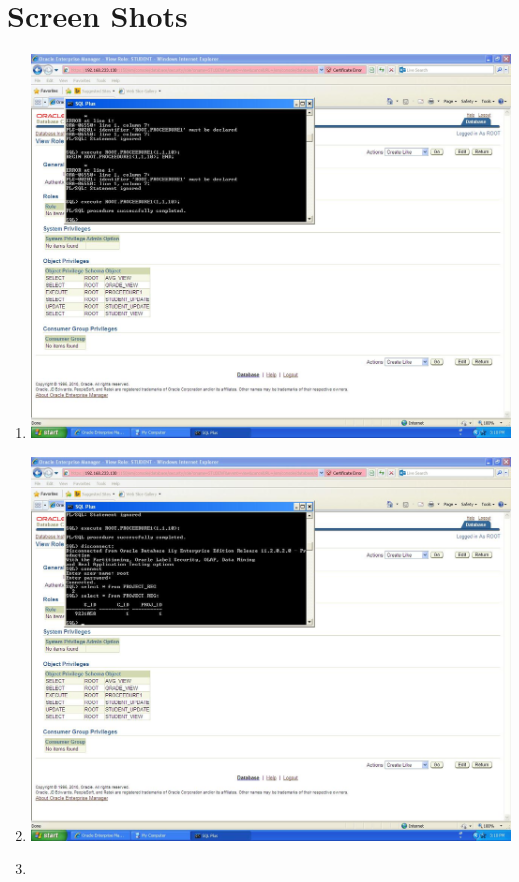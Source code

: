 \documentclass{article}
\begin{document}
\section{Screen Shots}
\begin{enumerate}
	\item
		\includegraphics[scale=0.4]{figs/1.JPG}\underline{}
	\item
		\includegraphics[scale=0.4]{figs/2.JPG}\underline{}
	\item

\end{enumerate}
\end{document}
